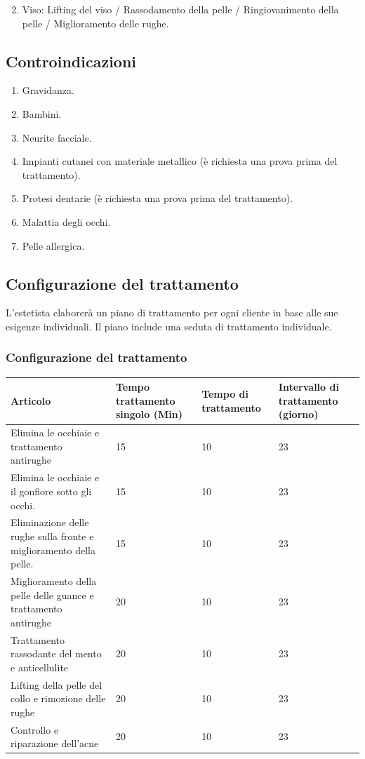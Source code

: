 \documentclass[a4paper]{article}
\begin{document}
\begin{enumerate}
  \setcounter{enumi}{1}
  \item Viso: Lifting del viso / Rassodamento della pelle / Ringiovanimento della pelle / Miglioramento delle rughe.
\end{enumerate}

\subsection{Controindicazioni}
\begin{enumerate}
  \item Gravidanza.
  \item Bambini.
  \item Neurite facciale.
  \item Impianti cutanei con materiale metallico (è richiesta una prova prima del trattamento).
  \item Protesi dentarie (è richiesta una prova prima del trattamento).
  \item Malattia degli occhi.
  \item Pelle allergica.
\end{enumerate}

\subsection{Configurazione del trattamento}
L'estetista elaborerà un piano di trattamento per ogni cliente in base alle sue esigenze individuali. Il piano include una seduta di trattamento individuale.

\subsubsection{Configurazione del trattamento}

\begin{table}[H]
	\small
	\setlength{\tabcolsep}{4pt} %
	\begin{tabular}{|p{4.5cm}|p{2.8cm}|p{2.5cm}|p{2.8cm}|}
		\hline
		\textbf{Articolo} & \textbf{Tempo trattamento singolo (Min)} & \textbf{Tempo di trattamento} & \textbf{Intervallo di trattamento (giorno)} \\
		\hline
		Elimina le occhiaie e trattamento antirughe & 15 & 10 & 23 \\
		\hline
		Elimina le occhiaie e il gonfiore sotto gli occhi. & 15 & 10 & 23 \\
		\hline
		Eliminazione delle rughe sulla fronte e miglioramento della pelle. & 15 & 10 & 23 \\
		\hline
		Miglioramento della pelle delle guance e trattamento antirughe & 20 & 10 & 23 \\
		\hline
		Trattamento rassodante del mento e anticellulite & 20 & 10 & 23 \\
		\hline
		Lifting della pelle del collo e rimozione delle rughe & 20 & 10 & 23 \\
		\hline
		Controllo e riparazione dell'acne & 20 & 10 & 23 \\
		\hline
	\end{tabular}
\end{table}
\end{document}
